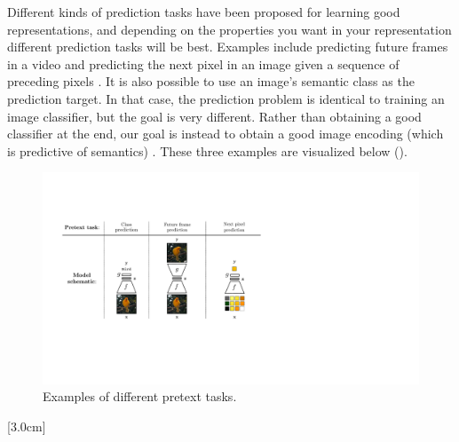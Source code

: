 Different kinds of prediction tasks have been proposed for learning good representations, and depending on the properties you want in your representation different prediction tasks will be best. Examples include predicting future frames in a video \cite{recasens2021broaden} and predicting the next pixel in an image given a sequence of preceding pixels \cite{chen2020generative}. It is also possible to use an image's semantic class as the prediction target. In that case, the prediction problem is identical to training an image classifier, but the goal is very different. Rather than obtaining a good classifier at the end, our goal is instead to obtain a good image encoding (which is predictive of semantics) \cite{donahue2014decafUSEdecafcitation}. These three examples are visualized below (\fig{\ref{fig:representation_learning:predictive_learning_examples}}).
\begin{figure}[h!]
    \centerline{
        \includegraphics[width=0.95\linewidth]{figures/representation_learning/predictive_learning_examples.pdf}
    }
    \caption{Examples of different pretext tasks.}
    \vspace{-1.0em}
    \label{fig:representation_learning:predictive_learning_examples}
\end{figure}
[3.0cm]

